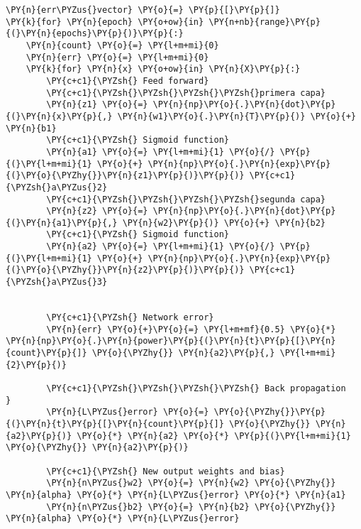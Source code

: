     \begin{tcolorbox}[breakable, size=fbox, boxrule=1pt, pad at break*=1mm,colback=cellbackground, colframe=cellborder]
\begin{Verbatim}[commandchars=\\\{\}]
\PY{n}{err\PYZus{}vector} \PY{o}{=} \PY{p}{[}\PY{p}{]}
\PY{k}{for} \PY{n}{epoch} \PY{o+ow}{in} \PY{n+nb}{range}\PY{p}{(}\PY{n}{epochs}\PY{p}{)}\PY{p}{:}
    \PY{n}{count} \PY{o}{=} \PY{l+m+mi}{0}
    \PY{n}{err} \PY{o}{=} \PY{l+m+mi}{0}
    \PY{k}{for} \PY{n}{x} \PY{o+ow}{in} \PY{n}{X}\PY{p}{:}
        \PY{c+c1}{\PYZsh{} Feed forward}
        \PY{c+c1}{\PYZsh{}\PYZsh{}\PYZsh{}\PYZsh{}primera capa}
        \PY{n}{z1} \PY{o}{=} \PY{n}{np}\PY{o}{.}\PY{n}{dot}\PY{p}{(}\PY{n}{x}\PY{p}{,} \PY{n}{w1}\PY{o}{.}\PY{n}{T}\PY{p}{)} \PY{o}{+} \PY{n}{b1} 
        \PY{c+c1}{\PYZsh{} Sigmoid function}
        \PY{n}{a1} \PY{o}{=} \PY{l+m+mi}{1} \PY{o}{/} \PY{p}{(}\PY{l+m+mi}{1} \PY{o}{+} \PY{n}{np}\PY{o}{.}\PY{n}{exp}\PY{p}{(}\PY{o}{\PYZhy{}}\PY{n}{z1}\PY{p}{)}\PY{p}{)} \PY{c+c1}{\PYZsh{}a\PYZus{}2}
        \PY{c+c1}{\PYZsh{}\PYZsh{}\PYZsh{}\PYZsh{}segunda capa}
        \PY{n}{z2} \PY{o}{=} \PY{n}{np}\PY{o}{.}\PY{n}{dot}\PY{p}{(}\PY{n}{a1}\PY{p}{,} \PY{n}{w2}\PY{p}{)} \PY{o}{+} \PY{n}{b2}
        \PY{c+c1}{\PYZsh{} Sigmoid function}
        \PY{n}{a2} \PY{o}{=} \PY{l+m+mi}{1} \PY{o}{/} \PY{p}{(}\PY{l+m+mi}{1} \PY{o}{+} \PY{n}{np}\PY{o}{.}\PY{n}{exp}\PY{p}{(}\PY{o}{\PYZhy{}}\PY{n}{z2}\PY{p}{)}\PY{p}{)} \PY{c+c1}{\PYZsh{}a\PYZus{}3}
        
        
        \PY{c+c1}{\PYZsh{} Network error}
        \PY{n}{err} \PY{o}{+}\PY{o}{=} \PY{l+m+mf}{0.5} \PY{o}{*} \PY{n}{np}\PY{o}{.}\PY{n}{power}\PY{p}{(}\PY{n}{t}\PY{p}{[}\PY{n}{count}\PY{p}{]} \PY{o}{\PYZhy{}} \PY{n}{a2}\PY{p}{,} \PY{l+m+mi}{2}\PY{p}{)}
        
        \PY{c+c1}{\PYZsh{}\PYZsh{}\PYZsh{}\PYZsh{} Back propagation        }
        \PY{n}{L\PYZus{}error} \PY{o}{=} \PY{o}{\PYZhy{}}\PY{p}{(}\PY{n}{t}\PY{p}{[}\PY{n}{count}\PY{p}{]} \PY{o}{\PYZhy{}} \PY{n}{a2}\PY{p}{)} \PY{o}{*} \PY{n}{a2} \PY{o}{*} \PY{p}{(}\PY{l+m+mi}{1} \PY{o}{\PYZhy{}} \PY{n}{a2}\PY{p}{)}
        
        \PY{c+c1}{\PYZsh{} New output weights and bias}
        \PY{n}{n\PYZus{}w2} \PY{o}{=} \PY{n}{w2} \PY{o}{\PYZhy{}} \PY{n}{alpha} \PY{o}{*} \PY{n}{L\PYZus{}error} \PY{o}{*} \PY{n}{a1}
        \PY{n}{n\PYZus{}b2} \PY{o}{=} \PY{n}{b2} \PY{o}{\PYZhy{}} \PY{n}{alpha} \PY{o}{*} \PY{n}{L\PYZus{}error}
        

\end{Verbatim}
\end{tcolorbox}
